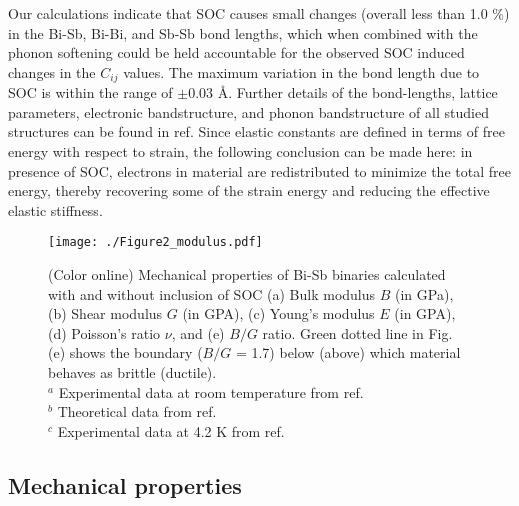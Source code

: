 \documentclass[twocolumn,superscriptaddress,nofootinbib,floatfix,aps,showpacs,prb,citeautoscript,reprint]{revtex4-1}
\begin{document}
Our calculations indicate that SOC causes small changes (overall less than 1.0 \%) in the Bi-Sb, Bi-Bi, and Sb-Sb bond lengths, which when combined with the phonon softening could be held accountable for the observed SOC induced changes in the $C_{ij}$ values. The maximum variation in the bond length due to SOC is within the range of $\pm$0.03 \AA. Further details of the bond-lengths, lattice parameters, electronic bandstructure, and phonon bandstructure of all studied structures can be found in ref. \cite{singh2016PCCP} Since elastic constants are defined in terms of free energy with respect to strain, the following conclusion can be made here: in presence of SOC, electrons in material are redistributed to minimize the total free energy, thereby recovering some of the strain energy and reducing the effective elastic stiffness. 
 
 
\begin{figure*}[htb!]
 \centering
 \texttt{[image: ./Figure2\_modulus.pdf]}
 \caption{(Color online) Mechanical properties of Bi-Sb binaries calculated with and without inclusion of SOC (a) Bulk modulus $B$ (in GPa), (b) Shear modulus $G$ (in GPA), (c) Young's modulus $E$ (in GPA), (d) Poisson's ratio $\nu$, and (e) $B/G$ ratio. Green dotted line in Fig. (e) shows the boundary ($B/G$ = 1.7) below (above) which material behaves as brittle (ductile). \\ 
 $^a$ Experimental data at room temperature from ref.\cite{Gopinathan1974} \\  
 $^b$ Theoretical data from ref.\cite{Jong2015} \\ 
 $^c$ Experimental data at 4.2 K from ref.\cite{Lichnowski1976} }
\label{fig:EC}
\end{figure*}


 \subsection{Mechanical properties}
\end{document}
